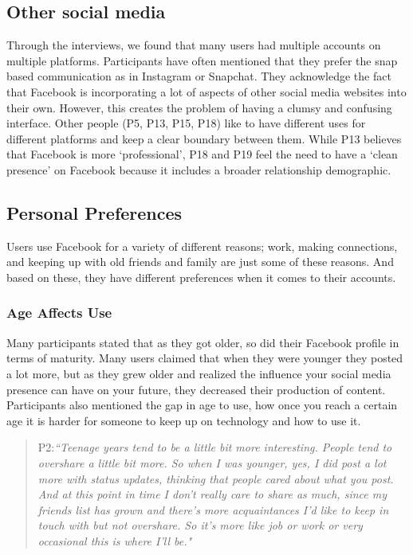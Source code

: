 \subsection{Other social media}
Through the interviews, we found that many users had multiple accounts on multiple platforms. Participants have often mentioned that they prefer the snap based communication as in Instagram or Snapchat. They acknowledge the fact that Facebook is incorporating a lot of aspects of other social media websites into their own. However, this creates the problem of having a clumsy and confusing interface. Other people (P5, P13, P15, P18) like to have different uses for different platforms and keep a clear boundary between them. While P13 believes that Facebook is more `professional', P18 and P19 feel the need to have a `clean presence' on Facebook because it includes a broader relationship demographic.

\subsection{Personal Preferences}
Users use Facebook for a variety of different reasons; work, making connections, and keeping up with old friends and family are just some of these reasons. And based on these, they have different preferences when it comes to their accounts.
\subsubsection{Age Affects Use}
Many participants stated that as they got older, so did their Facebook profile in terms of maturity. Many users claimed that when they were younger they posted a lot more, but as they grew older and realized the influence your social media presence can have on your future, they decreased their production of content. Participants also mentioned the gap in age to use, how once you reach a certain age it is harder for someone to keep up on technology and how to use it. 
\begin{quote}
P2:\textit{``Teenage years tend to be a little bit more interesting. People tend to overshare a little bit more. So when I was younger, yes, I did post a lot more with status updates, thinking that people cared about what you post. And at this point in time I don't really care to share as much, since my friends list has grown and there's more acquaintances I'd like to keep in touch with but not overshare. So it's more like job or work or very occasional this is where I'll be."}
\end{quote}
